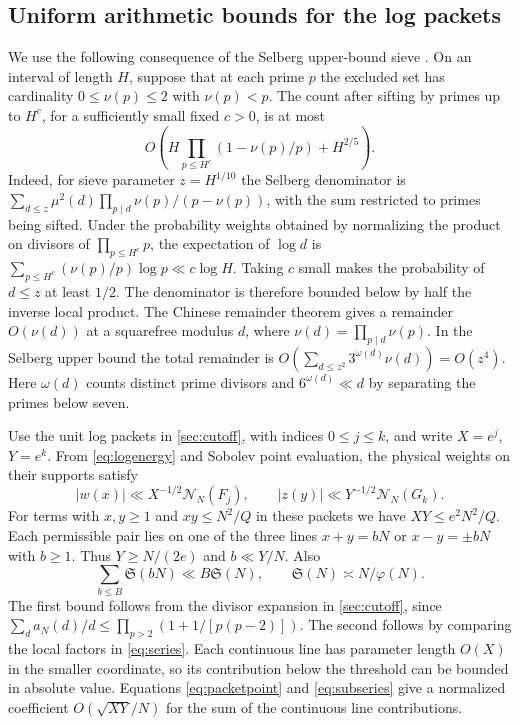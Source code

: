 \documentclass[11pt,a4paper]{article}
\numberwithin{equation}{section}
\newcommand{\SSS}{\mathfrak S}
\newcommand{\NN}{\mathcal N_N}
\begin{document}
\subsection{Uniform arithmetic bounds for the log packets}

We use the following consequence of the Selberg upper-bound
sieve \cite[Theorem~9.1]{Richert}. On an interval of length $H$,
suppose that at each prime $p$ the excluded set has cardinality
$0\le\nu(p)\le2$ with $\nu(p)<p$. The count after sifting by
primes up to $H^c$, for a sufficiently small fixed $c>0$, is at
most
\begin{equation}
  O\left(H\prod_{p\le H^c}(1-\nu(p)/p)+H^{2/5}\right).
  \label{eq:uniformsieve}
\end{equation}
Indeed, for sieve parameter $z=H^{1/10}$ the Selberg denominator
is $\sum_{d\le z}\mu^2(d)\prod_{p\mid d}\nu(p)/(p-\nu(p))$, with
the sum restricted to primes being sifted. Under the probability
weights obtained by normalizing the product on divisors of
$\prod_{p\le H^c}p$, the expectation of $\log d$ is
$\sum_{p\le H^c}(\nu(p)/p)\log p\ll c\log H$.
Taking $c$ small makes the probability of $d\le z$ at least $1/2$.
The denominator is therefore bounded below by half the inverse
local product. The Chinese remainder theorem gives a remainder
$O(\nu(d))$ at a squarefree modulus $d$, where
$\nu(d)=\prod_{p\mid d}\nu(p)$. In the Selberg upper bound the
total remainder is
$O(\sum_{d\le z^2}3^{\omega(d)}\nu(d))=O(z^4)$.
Here $\omega(d)$ counts distinct prime divisors and
$6^{\omega(d)}\ll d$ by separating the primes below seven.

Use the unit log packets in \cref{sec:cutoff}, with indices
$0\le j\le k$, and write $X=e^j$, $Y=e^k$. From \cref{eq:logenergy}
and Sobolev point evaluation, the physical weights on their supports
satisfy
\begin{equation}
  |w(x)|\ll X^{-1/2}\NN(F_j),\qquad
  |z(y)|\ll Y^{-1/2}\NN(G_k).
  \label{eq:packetpoint}
\end{equation}
For terms with $x,y\ge1$ and $xy\le N^2/Q$ in these packets we
have $XY\le e^2N^2/Q$. Each permissible pair lies on one of the
three lines $x+y=bN$ or $x-y=\pm bN$ with $b\ge1$.
Thus $Y\ge N/(2e)$ and $b\ll Y/N$. Also
\begin{equation}
 \sum_{b\le B}\SSS(bN)\ll B\SSS(N),\qquad
 \SSS(N)\asymp N/\varphi(N).
 \label{eq:subseries}
\end{equation}
The first bound follows from the divisor expansion in
\cref{sec:cutoff}, since
$\sum_d a_N(d)/d\le\prod_{p>2}(1+1/[p(p-2)])$.
The second follows by comparing the local factors in \cref{eq:series}.
Each continuous line has parameter length $O(X)$ in the smaller
coordinate, so its contribution below the threshold can be bounded
in absolute value. Equations \eqref{eq:packetpoint} and
\eqref{eq:subseries} give a normalized coefficient
$O(\sqrt{XY}/N)$ for the sum of the continuous line contributions.
\end{document}
